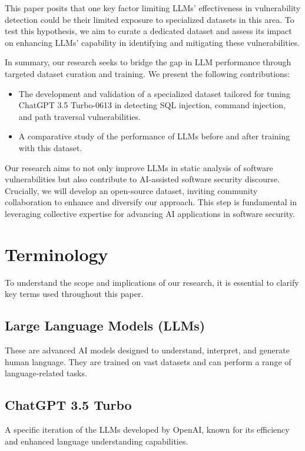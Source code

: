 \documentclass[acmsmall]{acmart}
\begin{document}
This paper posits that one key factor limiting LLMs' effectiveness in vulnerability detection could be their limited exposure to specialized datasets in this area. To test this hypothesis, we aim to curate a dedicated dataset and assess its impact on enhancing LLMs' capability in identifying and mitigating these vulnerabilities.

In summary, our research seeks to bridge the gap in LLM performance through targeted dataset curation and training. We present the following contributions:

\begin{itemize}
  \item The development and validation of a specialized dataset tailored for tuning ChatGPT 3.5 Turbo-0613 in detecting SQL injection, command injection, and path traversal vulnerabilities.
  \item A comparative study of the performance of LLMs before and after training with this dataset.
  \end{itemize}

Our research aims to not only improve LLMs in static analysis of software vulnerabilities but also contribute to AI-assisted software security discourse. Crucially, we will develop an open-source dataset, inviting community collaboration to enhance and diversify our approach. This step is fundamental in leveraging collective expertise for advancing AI applications in software security.

\section{Terminology}
To understand the scope and implications of our research, it is essential to clarify key terms used throughout this paper.

\subsection{Large Language Models (LLMs)}
These are advanced AI models designed to understand, interpret, and generate human language. They are trained on vast datasets and can perform a range of language-related tasks.

\subsection{ChatGPT 3.5 Turbo}
A specific iteration of the LLMs developed by OpenAI, known for its efficiency and enhanced language understanding capabilities.
\end{document}

